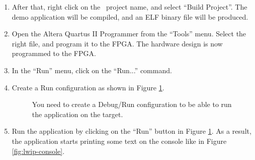\begin{enumerate}
\item After that, right click on the \rtd\ project name, and select
  ``Build Project''.  The demo application will be compiled, and an
  ELF binary file will be produced.
%
\item Open the Altera Quartus II Programmer from the ``Tools''
  menu. Select the right  file, and program it to
  the FPGA. The hardware design is now programmed to the FPGA.

\item In the ``Run'' menu, click on the ``Run...'' command. 

\item Create a Run configuration as shown in Figure
  \ref{fig:lwip-run-configuration}.
%
\begin{figure}
\caption{\label{fig:lwip-run-configuration}You need to create a
Debug/Run configuration to be able to run the application on the
target.}
\end{figure}
%
\item Run the application by clicking on the ``Run'' button in Figure
  \ref{fig:lwip-run-configuration}. As a result, the application
  starts printing some text on the console like in Figure
  \ref{fig:lwip-console}.
%
\begin{figure}

\end{figure}
\end{enumerate}
